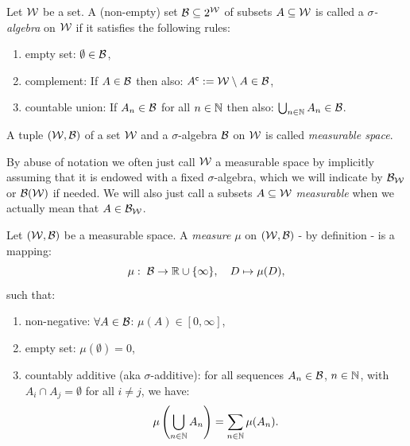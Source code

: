 \begin{Def}
    \label{def-sigma-algebra}
    Let $\mathcal{W}$ be a set. A (non-empty) set $\mathcal{B} \subseteq 2^{\mathcal{W}}$ of subsets $A \subseteq \mathcal{W}$ is called a 
    \emph{$\sigma$-algebra} on $\mathcal{W}$ if it satisfies the following rules:
    \begin{enumerate}[label=\roman*)]
        \item empty set: $\emptyset \in \mathcal{B}$,
        \item complement: If $A \in \mathcal{B}$ then also: $A^{\mathsf{c}}:= \mathcal{W}\setminus A \in \mathcal{B}$,
        \item countable union: If $A_n \in \mathcal{B}$ for all $n \in \mathbb{N}$ then also: $\bigcup_{n \in \mathbb{N}} A_n \in \mathcal{B}$.
    \end{enumerate}
\end{Def}

\begin{Def}
    \label{def-measurable-space}
    A tuple $(\mathcal{W},\mathcal{B})$ of a set $\mathcal{W}$ and a $\sigma$-algebra $\mathcal{B}$ on $\mathcal{W}$ is called \emph{measurable space}.
\end{Def}

\begin{Rem}
 By abuse of notation we often just call $\mathcal{W}$ a measurable space by implicitly assuming that it is endowed with a fixed $\sigma$-algebra, which we will indicate by $\mathcal{B}_{\mathcal{W}}$ or $\mathcal{B}(\mathcal{W})$ if needed. We will also just call a subsets $A \subseteq \mathcal{W}$ \emph{measurable} when we actually mean that $A \in \mathcal{B}_{\mathcal{W}}$.
\end{Rem}

\begin{Def}[Measures]
    \label{def-measure}
    Let $(\mathcal{W},\mathcal{B})$ be a measurable space.
    A \emph{measure} $\mu$ on $(\mathcal{W},\mathcal{B})$ - by definition - is a mapping:
    \[\mu: \; \mathcal{B} \to \mathbb{R} \cup \{\infty\},\quad D \mapsto \mu(D), \]
    such that:
    \begin{enumerate}[label=\roman*)]
        \item non-negative: $\forall A \in \mathcal{B}$: $\mu(A) \in [0,\infty]$,
        \item empty set: $\mu(\emptyset) =0$,
        \item countably additive (aka $\sigma$-additive): for all sequences $A_n \in \mathcal{B}$, $n \in \mathbb{N}$, with $A_i \cap A_j = \emptyset$ for all $i \neq j$, we have:
    \[\mu\left (\bigcup_{n \in \mathbb{N}} A_n\right ) = \sum_{n \in \mathbb{N}} \mu(A_n).\]
    \end{enumerate}
    \end{Def}

